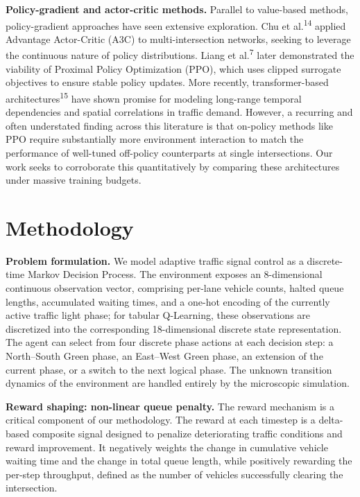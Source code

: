 \documentclass[10pt,a4paper]{article}
\begin{document}
\textbf{Policy-gradient and actor-critic methods.}
Parallel to value-based methods, policy-gradient approaches have seen extensive exploration. Chu et al.\textsuperscript{14} applied Advantage Actor-Critic (A3C) to multi-intersection networks, seeking to leverage the continuous nature of policy distributions. Liang et al.\textsuperscript{7} later demonstrated the viability of Proximal Policy Optimization (PPO), which uses clipped surrogate objectives to ensure stable policy updates. More recently, transformer-based architectures\textsuperscript{15} have shown promise for modeling long-range temporal dependencies and spatial correlations in traffic demand. However, a recurring and often understated finding across this literature is that on-policy methods like PPO require substantially more environment interaction to match the performance of well-tuned off-policy counterparts at single intersections. Our work seeks to corroborate this quantitatively by comparing these architectures under massive training budgets.

\section{Methodology}

\textbf{Problem formulation.}
We model adaptive traffic signal control as a discrete-time Markov Decision Process. The environment exposes an 8-dimensional continuous observation vector, comprising per-lane vehicle counts, halted queue lengths, accumulated waiting times, and a one-hot encoding of the currently active traffic light phase; for tabular Q-Learning, these observations are discretized into the corresponding 18-dimensional discrete state representation. The agent can select from four discrete phase actions at each decision step: a North--South Green phase, an East--West Green phase, an extension of the current phase, or a switch to the next logical phase. The unknown transition dynamics of the environment are handled entirely by the microscopic simulation.

\textbf{Reward shaping: non-linear queue penalty.}
The reward mechanism is a critical component of our methodology. The reward at each timestep is a delta-based composite signal designed to penalize deteriorating traffic conditions and reward improvement. It negatively weights the change in cumulative vehicle waiting time and the change in total queue length, while positively rewarding the per-step throughput, defined as the number of vehicles successfully clearing the intersection.
\end{document}
